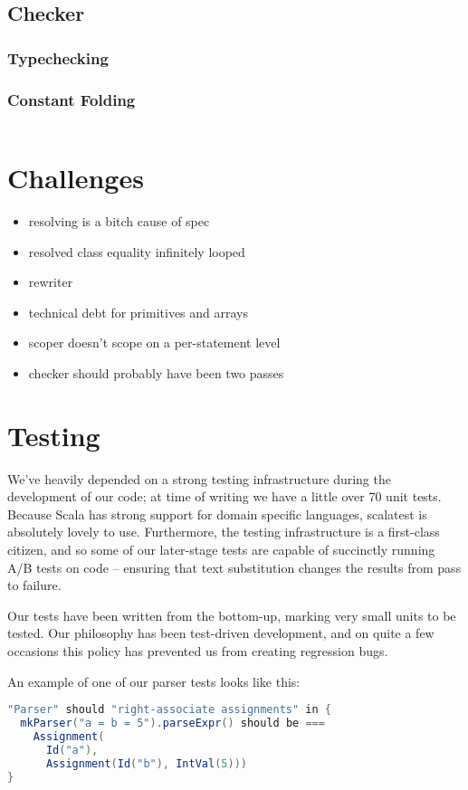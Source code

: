 \documentclass{article}
\begin{document}
\subsection{Checker}
\subsubsection{Typechecking}
\subsubsection{Constant Folding}

\begin{lstlisting}[language=Scala]
\end{lstlisting}



\section{Challenges}
\begin{itemize}
    \item resolving is a bitch cause of spec
    \item resolved class equality infinitely looped
    \item rewriter
    \item technical debt for primitives and arrays
    \item scoper doesn't scope on a per-statement level
    \item checker should probably have been two passes
\end{itemize}




\section{Testing}

We've heavily depended on a strong testing infrastructure during the development of our code; at time of writing we have
a little over 70 unit tests. Because Scala has strong support for domain specific languages, scalatest is absolutely
lovely to use. Furthermore, the testing infrastructure is a first-class citizen, and so some of our later-stage tests
are capable of succinctly running A/B tests on code -- ensuring that text substitution changes the results from pass to
failure.

Our tests have been written from the bottom-up, marking very small units to be tested. Our philosophy has been
test-driven development, and on quite a few occasions this policy has prevented us from creating regression bugs.

An example of one of our parser tests looks like this:

\begin{lstlisting}[language=Scala]
"Parser" should "right-associate assignments" in {
  mkParser("a = b = 5").parseExpr() should be ===
    Assignment(
      Id("a"),
      Assignment(Id("b"), IntVal(5)))
}
\end{lstlisting}

\testsrc{*}
\end{document}

